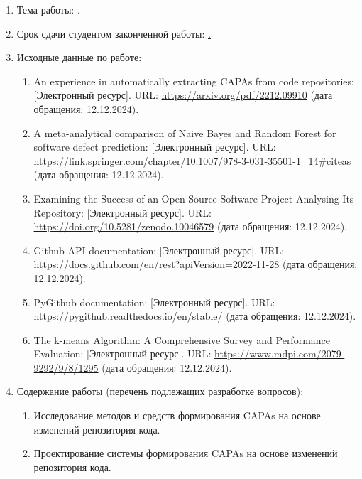 \begin{enumerate}[1.]
\item Тема работы: {\expandafter \thesisTitle.}
\item Срок сдачи студентом законченной работы: \uline{\thesisDeadline.} 
\item Исходные данные по работе: \begin{enumerate}[label=\theenumi\arabic*.]
	\item An experience in automatically extracting CAPAs from code repositories: [Электронный ресурс]. URL: \url{https://arxiv.org/pdf/2212.09910} (дата обращения: 12.12.2024).
	\item A meta-analytical comparison of Naive Bayes and Random Forest for software defect prediction: [Электронный ресурс]. URL: \url{https://link.springer.com/chapter/10.1007/978-3-031-35501-1_14#citeas} (дата обращения: 12.12.2024).
	\item Examining the Success of an Open Source Software Project Analysing Its Repository: [Электронный ресурс]. URL: \url{https://doi.org/10.5281/zenodo.10046579} (дата обращения: 12.12.2024).
	\item Github API documentation: [Электронный ресурс]. URL: \url{https://docs.github.com/en/rest?apiVersion=2022-11-28} (дата обращения: 12.12.2024).
	\item PyGithub documentation: [Электронный ресурс]. URL: \url{https://pygithub.readthedocs.io/en/stable/} (дата обращения: 12.12.2024).
	\item The k-means Algorithm: A Comprehensive Survey and Performance Evaluation: [Электронный ресурс]. URL: \url{https://www.mdpi.com/2079-9292/9/8/1295} (дата обращения: 12.12.2024).
\end{enumerate}
\printbibliographyTask %
\item Содержание работы (перечень подлежащих разработке вопросов):
\begin{enumerate}[label=\theenumi\arabic*.]
\item Исследование методов и средств  формирования CAPAs на основе изменений репозитория кода.
\item Проектирование системы формирования CAPAs на основе изменений репозитория кода.

\end{enumerate}
\end{enumerate}
